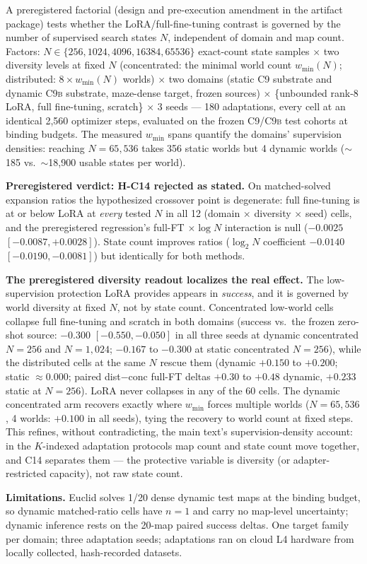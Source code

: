 \documentclass[letterpaper]{article} %
\newcommand{\stage}[1]{\textsc{#1}}
\begin{document}
A preregistered factorial (design and pre-execution amendment in the artifact package) tests whether the LoRA/full-fine-tuning contrast is governed by the number of supervised search states $N$, independent of domain and map count. Factors: $N \in \{256, 1024, 4096, 16384, 65536\}$ exact-count state samples $\times$ two diversity levels at fixed $N$ (concentrated: the minimal world count $w_{\min}(N)$; distributed: $8 \times w_{\min}(N)$ worlds) $\times$ two domains (static \stage{C9} substrate and dynamic \stage{C9b} substrate, maze-dense target, frozen sources) $\times$ \{unbounded rank-8 LoRA, full fine-tuning, scratch\} $\times$ 3 seeds --- 180 adaptations, every cell at an identical 2{,}560 optimizer steps, evaluated on the frozen \stage{C9}/\stage{C9b} test cohorts at binding budgets. The measured $w_{\min}$ spans quantify the domains' supervision densities: reaching $N{=}65{,}536$ takes 356 static worlds but 4 dynamic worlds ($\sim$185 vs.\ $\sim$18{,}900 usable states per world).

\textbf{Preregistered verdict: H-C14 rejected as stated.} On matched-solved expansion ratios the hypothesized crossover point is degenerate: full fine-tuning is at or below LoRA at \emph{every} tested $N$ in all 12 (domain $\times$ diversity $\times$ seed) cells, and the preregistered regression's full-FT $\times \log N$ interaction is null ($-0.0025$ $[-0.0087, +0.0028]$). State count improves ratios ($\log_2 N$ coefficient $-0.0140$ $[-0.0190, -0.0081]$) but identically for both methods.

\textbf{The preregistered diversity readout localizes the real effect.} The low-supervision protection LoRA provides appears in \emph{success}, and it is governed by world diversity at fixed $N$, not by state count. Concentrated low-world cells collapse full fine-tuning and scratch in both domains (success vs.\ the frozen zero-shot source: $-0.300$ $[-0.550,-0.050]$ in all three seeds at dynamic concentrated $N{=}256$ and $N{=}1{,}024$; $-0.167$ to $-0.300$ at static concentrated $N{=}256$), while the distributed cells at the same $N$ rescue them (dynamic $+0.150$ to $+0.200$; static $\approx 0.000$; paired dist$-$conc full-FT deltas $+0.30$ to $+0.48$ dynamic, $+0.233$ static at $N{=}256$). LoRA never collapses in any of the 60 cells. The dynamic concentrated arm recovers exactly where $w_{\min}$ forces multiple worlds ($N{=}65{,}536$, 4 worlds: $+0.100$ in all seeds), tying the recovery to world count at fixed steps. This refines, without contradicting, the main text's supervision-density account: in the $K$-indexed adaptation protocols map count and state count move together, and C14 separates them --- the protective variable is diversity (or adapter-restricted capacity), not raw state count.

\textbf{Limitations.} Euclid solves 1/20 dense dynamic test maps at the binding budget, so dynamic matched-ratio cells have $n{=}1$ and carry no map-level uncertainty; dynamic inference rests on the 20-map paired success deltas. One target family per domain; three adaptation seeds; adaptations ran on cloud L4 hardware from locally collected, hash-recorded datasets.
\end{document}
